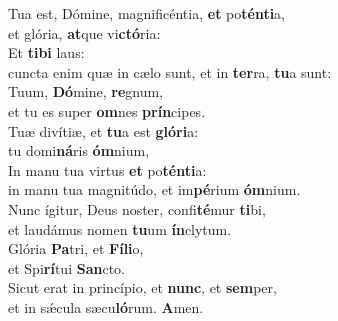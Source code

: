 \evenverse Tua est, Dómine, magnificéntia, \textbf{et} po\textbf{tén}\textbf{ti}a,~\*\\
\evenverse et glória, \textbf{at}que vi\textbf{ctó}ria:\\
\oddverse Et \textbf{ti}\textbf{bi} laus:~\*\\
\oddverse cuncta enim quæ in cælo sunt, et in \textbf{ter}ra, \textbf{tu}a sunt:\\
\evenverse Tuum, \textbf{Dó}mine, \textbf{re}gnum,~\*\\
\evenverse et tu es super \textbf{om}nes \textbf{prín}cipes.\\
\oddverse Tuæ divítiæ, et \textbf{tu}a est \textbf{gló}\textbf{ri}a:~\*\\
\oddverse tu domi\textbf{ná}ris \textbf{óm}nium,\\
\evenverse In manu tua virtus \textbf{et} po\textbf{tén}\textbf{ti}a:~\*\\
\evenverse in manu tua magnitúdo, et im\textbf{pé}rium \textbf{óm}nium.\\
\oddverse Nunc ígitur, Deus noster, confi\textbf{té}mur \textbf{ti}bi,~\*\\
\oddverse et laudámus nomen \textbf{tu}um \textbf{ín}clytum.\\
\evenverse Glória \textbf{Pa}tri, et \textbf{Fí}\textbf{li}o,~\*\\
\evenverse et Spi\textbf{rí}tui \textbf{San}cto.\\
\oddverse Sicut erat in princípio, et \textbf{nunc}, et \textbf{sem}per,~\*\\
\oddverse et in sǽcula sæcu\textbf{ló}rum. \textbf{A}men.\\
